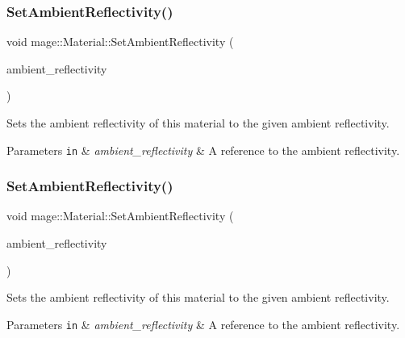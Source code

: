 \subsubsection{\texorpdfstring{Set\+Ambient\+Reflectivity()}{SetAmbientReflectivity()}\hspace{0.1cm}{\footnotesize\ttfamily [1/2]}}
{\footnotesize\ttfamily void mage\+::\+Material\+::\+Set\+Ambient\+Reflectivity (\begin{DoxyParamCaption}\item[{const \hyperlink{structmage_1_1_r_g_b_spectrum}{R\+G\+B\+Spectrum} \&}]{ambient\+\_\+reflectivity }\end{DoxyParamCaption})\hspace{0.3cm}{\ttfamily [noexcept]}}

Sets the ambient reflectivity of this material to the given ambient reflectivity.


\begin{DoxyParams}[1]{Parameters}
\mbox{\tt in}  & {\em ambient\+\_\+reflectivity} & A reference to the ambient reflectivity. \\
\hline
\end{DoxyParams}
\hypertarget{structmage_1_1_material_a0c5f2c3a8b79c8498e9501e33acf8147}{}\label{structmage_1_1_material_a0c5f2c3a8b79c8498e9501e33acf8147} 
\subsubsection{\texorpdfstring{Set\+Ambient\+Reflectivity()}{SetAmbientReflectivity()}\hspace{0.1cm}{\footnotesize\ttfamily [2/2]}}
{\footnotesize\ttfamily void mage\+::\+Material\+::\+Set\+Ambient\+Reflectivity (\begin{DoxyParamCaption}\item[{\hyperlink{structmage_1_1_r_g_b_spectrum}{R\+G\+B\+Spectrum} \&\&}]{ambient\+\_\+reflectivity }\end{DoxyParamCaption})\hspace{0.3cm}{\ttfamily [noexcept]}}

Sets the ambient reflectivity of this material to the given ambient reflectivity.


\begin{DoxyParams}[1]{Parameters}
\mbox{\tt in}  & {\em ambient\+\_\+reflectivity} & A reference to the ambient reflectivity. \\
\hline
\end{DoxyParams}
\hypertarget{structmage_1_1_material_a220430d91bcc02a78a8e1601d7725417}{}\label{structmage_1_1_material_a220430d91bcc02a78a8e1601d7725417} 
